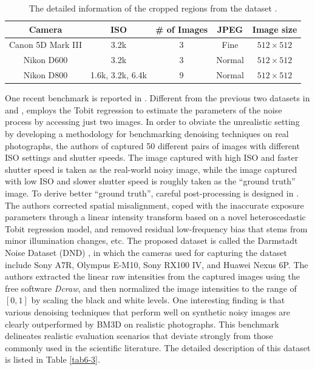\begin{table}[t!]
\caption{The detailed information of the cropped regions from the dataset \cite{crosschannel2016}.}
\label{tab6-2}
\begin{center}
\small
\renewcommand\arraystretch{1.2}
\begin{tabular*}{1\textwidth}{@{\extracolsep{\fill}}ccccc}
\hline
Camera
& 
ISO
&
\# of Images
&
JPEG
&
Image size
\\
\hline
Canon 5D Mark III & 3.2k  & 3  & Fine & $512\times512$
\\
\hline
Nikon D600 & 3.2k & 3  & Normal & $512\times512$
\\
\hline   
Nikon D800 & 1.6k, 3.2k, 6.4k & 9  & Normal & $512\times512$
\\
\hline
\end{tabular*}
\end{center}
\vspace{-4mm}
\end{table}

One recent benchmark is reported in \cite{dnd2017}. Different from the previous two datasets in \cite{RENOIR2014} and \cite{crosschannel2016}, \cite{dnd2017} employs the Tobit regression to estimate the parameters of the noise process by accessing just two images. In order to obviate the unrealistic setting by developing a methodology for benchmarking denoising techniques on real photographs, the authors of \cite{dnd2017} captured 50 different pairs of images with different ISO settings and shutter speeds. The image captured with high ISO and faster shutter speed is taken as the real-world noisy image, while the image captured with low ISO and slower shutter speed is roughly taken as the ``ground truth'' image. To derive better ``ground truth'', careful post-processing is designed in \cite{dnd2017}. The authors corrected spatial misalignment, coped with the inaccurate exposure parameters through a linear intensity transform based on a novel heteroscedastic Tobit regression model, and removed residual low-frequency bias that stems from minor illumination changes, etc. The proposed dataset is called the Darmstadt Noise Dataset (DND) \cite{dnd2017}, in which the cameras used for capturing the dataset include Sony A7R, Olympus E-M10, Sony RX100 IV, and Huawei Nexus 6P. The authors extracted the linear raw intensities from the captured images using the free software \textsl{Dcraw}, and then normalized the image intensities to the range of $[0, 1]$ by scaling the black and white levels. One interesting finding is that various denoising techniques that perform well on synthetic noisy images are clearly outperformed by BM3D \cite{bm3d} on realistic photographs. This benchmark delineates realistic evaluation scenarios that deviate strongly from those commonly used in the scientific literature. The detailed description of this dataset is listed in Table \ref{tab6-3}.

